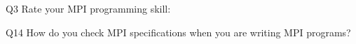 \begin{description}%
\item{Q3} Rate your MPI programming skill:%
\item{Q14} How do you check MPI specifications when you are writing MPI programs?%
\end{description}%
